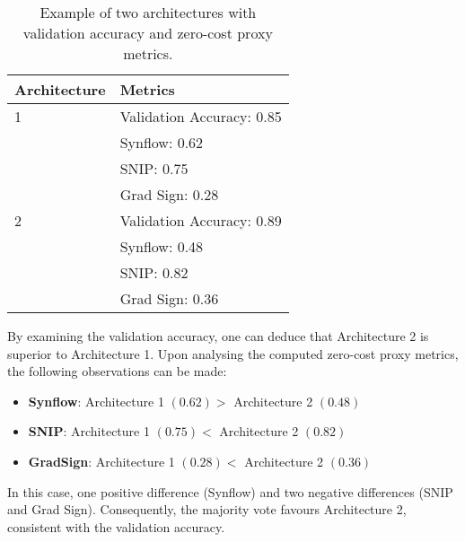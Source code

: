 \begin{table}[h]
\centering
\caption{Example of two architectures with validation accuracy and zero-cost proxy metrics.}
\begin{tabular}{ll}
\textbf{Architecture} & \textbf{Metrics}          \\ \hline
\multicolumn{1}{l|}{1} & \multicolumn{1}{l}{Validation Accuracy: 0.85} \\
\multicolumn{1}{l|}{\cellcolor{verylightgray}} & \cellcolor{verylightgray}Synflow: 0.62 \\
\multicolumn{1}{l|}{} & \multicolumn{1}{l}{SNIP: 0.75} \\
\multicolumn{1}{l|}{\cellcolor{verylightgray}} & \cellcolor{verylightgray}Grad Sign: 0.28 \\ \hline
\multicolumn{1}{l|}{2} & \multicolumn{1}{l}{Validation Accuracy: 0.89} \\
\multicolumn{1}{l|}{\cellcolor{verylightgray}} & \cellcolor{verylightgray}Synflow: 0.48 \\
\multicolumn{1}{l|}{} & \multicolumn{1}{l}{SNIP: 0.82} \\
\multicolumn{1}{l|}{\cellcolor{verylightgray}} & \cellcolor{verylightgray}Grad Sign: 0.36
\end{tabular}
\label{tab:example_architectures}
\end{table}

By examining the validation accuracy, one can deduce that Architecture 2 is superior to Architecture 1. Upon analysing the computed zero-cost proxy metrics, the following observations can be made:

\begin{itemize}
\item \textbf{Synflow}: Architecture 1 $(0.62) >$ Architecture 2 $(0.48)$
\item \textbf{SNIP}: Architecture 1 $(0.75) <$ Architecture 2 $(0.82)$
\item \textbf{GradSign}: Architecture 1 $(0.28) <$ Architecture 2 $(0.36)$
\end{itemize}

In this case, one positive difference (Synflow) and two negative differences (SNIP and Grad Sign). Consequently, the majority vote favours Architecture 2, consistent with the validation accuracy.